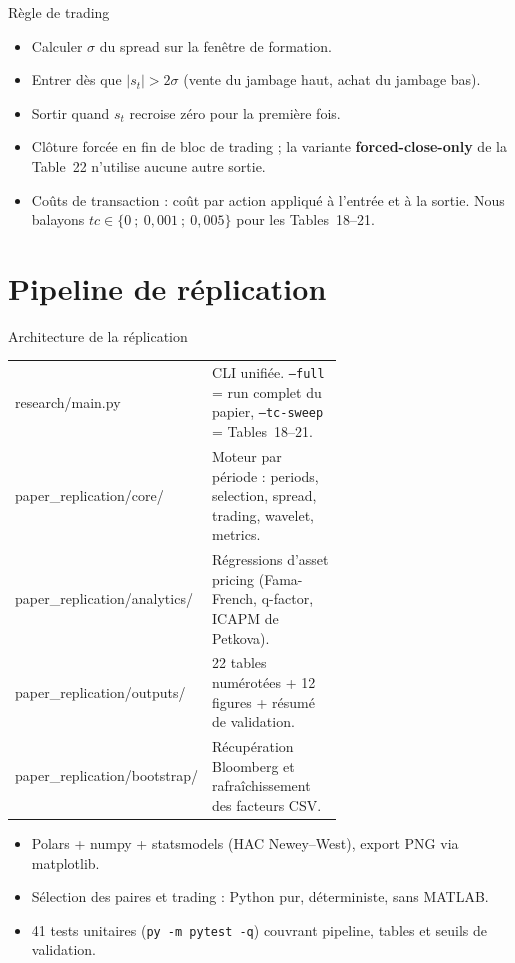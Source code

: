 \documentclass[10pt,aspectratio=169]{beamer}
\begin{document}
\begin{frame}{Règle de trading}
  \begin{itemize}
    \item Calculer $\sigma$ du spread sur la fenêtre de formation.
    \item Entrer dès que $|s_t| > 2\sigma$ (vente du jambage haut, achat du jambage bas).
    \item Sortir quand $s_t$ recroise zéro pour la première fois.
    \item Clôture forcée en fin de bloc de trading ; la variante
          \textbf{forced-close-only} de la Table~22 n'utilise aucune autre sortie.
    \item Coûts de transaction : coût par action appliqué à l'entrée et
          à la sortie. Nous balayons $tc \in \{0~;~0{,}001~;~0{,}005\}$
          pour les Tables~18--21.
  \end{itemize}
\end{frame}

\section{Pipeline de réplication}
\begin{frame}{Architecture de la réplication}
  \footnotesize
  \begin{tabular}{>{\ttfamily}l p{0.65\linewidth}}
    \toprule
    research/main.py            & CLI unifiée. \texttt{--full} = run complet du papier, \texttt{--tc-sweep} = Tables~18--21. \\
    paper\_replication/core/    & Moteur par période : periods, selection, spread, trading, wavelet, metrics. \\
    paper\_replication/analytics/ & Régressions d'asset pricing (Fama-French, q-factor, ICAPM de Petkova). \\
    paper\_replication/outputs/ & 22 tables numérotées + 12 figures + résumé de validation. \\
    paper\_replication/bootstrap/ & Récupération Bloomberg et rafraîchissement des facteurs CSV. \\
    \bottomrule
  \end{tabular}
  \vskip6pt
  \begin{itemize}
    \item Polars + numpy + statsmodels (HAC Newey--West), export PNG via matplotlib.
    \item Sélection des paires et trading : Python pur, déterministe, sans MATLAB.
    \item 41 tests unitaires (\texttt{py -m pytest -q}) couvrant pipeline,
          tables et seuils de validation.
  \end{itemize}
\end{frame}
\end{document}
